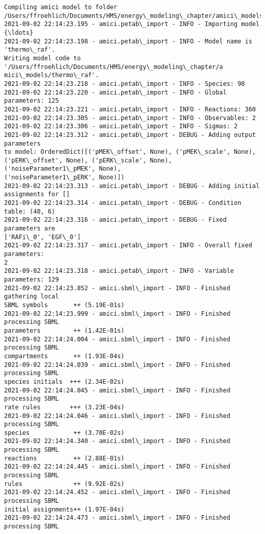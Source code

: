 \documentclass[11pt]{article}
\begin{document}
    \begin{Verbatim}[commandchars=\\\{\}]
Compiling amici model to folder
/Users/ffroehlich/Documents/HMS/energy\_modeling\_chapter/amici\_models/thermo\_raf.
2021-09-02 22:14:23.195 - amici.petab\_import - INFO - Importing model {\ldots}
2021-09-02 22:14:23.198 - amici.petab\_import - INFO - Model name is
'thermo\_raf'.
Writing model code to '/Users/ffroehlich/Documents/HMS/energy\_modeling\_chapter/a
mici\_models/thermo\_raf'.
2021-09-02 22:14:23.218 - amici.petab\_import - INFO - Species: 98
2021-09-02 22:14:23.220 - amici.petab\_import - INFO - Global parameters: 125
2021-09-02 22:14:23.221 - amici.petab\_import - INFO - Reactions: 360
2021-09-02 22:14:23.305 - amici.petab\_import - INFO - Observables: 2
2021-09-02 22:14:23.306 - amici.petab\_import - INFO - Sigmas: 2
2021-09-02 22:14:23.312 - amici.petab\_import - DEBUG - Adding output parameters
to model: OrderedDict([('pMEK\_offset', None), ('pMEK\_scale', None),
('pERK\_offset', None), ('pERK\_scale', None), ('noiseParameter1\_pMEK', None),
('noiseParameter1\_pERK', None)])
2021-09-02 22:14:23.313 - amici.petab\_import - DEBUG - Adding initial
assignments for []
2021-09-02 22:14:23.314 - amici.petab\_import - DEBUG - Condition table: (40, 6)
2021-09-02 22:14:23.316 - amici.petab\_import - DEBUG - Fixed parameters are
['RAFi\_0', 'EGF\_0']
2021-09-02 22:14:23.317 - amici.petab\_import - INFO - Overall fixed parameters:
2
2021-09-02 22:14:23.318 - amici.petab\_import - INFO - Variable parameters: 129
2021-09-02 22:14:23.852 - amici.sbml\_import - INFO - Finished gathering local
SBML symbols       ++ (5.19E-01s)
2021-09-02 22:14:23.999 - amici.sbml\_import - INFO - Finished processing SBML
parameters         ++ (1.42E-01s)
2021-09-02 22:14:24.004 - amici.sbml\_import - INFO - Finished processing SBML
compartments       ++ (1.93E-04s)
2021-09-02 22:14:24.039 - amici.sbml\_import - INFO - Finished processing SBML
species initials  +++ (2.34E-02s)
2021-09-02 22:14:24.045 - amici.sbml\_import - INFO - Finished processing SBML
rate rules        +++ (3.23E-04s)
2021-09-02 22:14:24.046 - amici.sbml\_import - INFO - Finished processing SBML
species            ++ (3.70E-02s)
2021-09-02 22:14:24.340 - amici.sbml\_import - INFO - Finished processing SBML
reactions          ++ (2.88E-01s)
2021-09-02 22:14:24.445 - amici.sbml\_import - INFO - Finished processing SBML
rules              ++ (9.92E-02s)
2021-09-02 22:14:24.452 - amici.sbml\_import - INFO - Finished processing SBML
initial assignments++ (1.97E-04s)
2021-09-02 22:14:24.473 - amici.sbml\_import - INFO - Finished processing SBML

\end{Verbatim}
\end{document}
